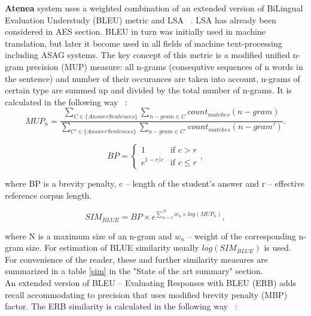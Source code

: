 \documentclass[11pt]{report}
\numberwithin{equation}{section} %
\begin{document}
\textbf{Atenea} system uses a weighted combination of an extended version of BiLingual Evaluation Understudy (BLEU) metric and LSA ~\cite{ERB}. LSA has already been considered in AES section. BLEU in turn was initially used in machine translation, but later it become used in all fields of machine text-processing including ASAG systems. The key concept of this metric is a modified unified n-gram precision (MUP) measure: all n-grams (consequtive sequences of n words in the sentence) and number of their occurances are taken into account, n-grams of certain type are summed up and divided by the total number of n-grams. It is calculated in the following way ~\cite{BLEU}:\\

\begin{equation} \label{eq:MUP}
MUP_n = \frac{\sum\limits_{C \in \{AnswerSentences\}} \sum\limits_{n-gram \in C} count_{matches}(n-gram)}{\sum\limits_{C' \in \{AnswerSentences\}} \sum\limits_{n-gram \in C'} count_{matches}(n-gram')}.
\end{equation}

\begin{equation} \label{eq:BP}
BP = \begin{cases}
   1 &\text{if $c>r$}\\
   e^{1-r/c} &\text{if $c \leq r$}
 \end{cases},
\end{equation}

where BP is a brevity penalty, c -- length of the student's answer and r -- effective reference corpus length.

\begin{equation} \label{eq:BLUE}
SIM_{BLUE} = BP \times e^{\sum^N_{n=1}w_n \times log(MUP_n)},
\end{equation}

where N is a maximum size of an n-gram and $w_n$ -- weight of the corresponding n-gram size. For estimation of BLUE similarity usually $log(SIM_{BLUE})$ is used. \\

For convenience of the reader, these and further similarity measures are summarized in a table \ref{sim} in the "State of the art summary" section.\\

An extended version of BLEU -- Evaluating Responses with BLEU (ERB) adds recall accommodating to precision that uses modified brevity penalty (MBP) factor. The ERB similarity is calculated in the following way ~\cite{ERB}:
\end{document}
